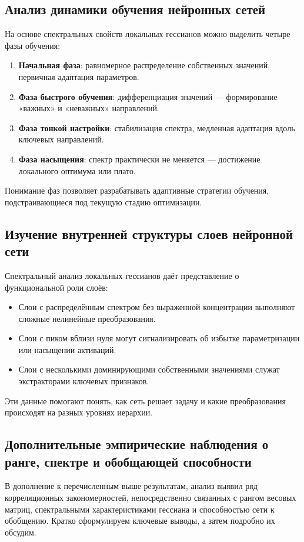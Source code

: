 \documentclass[a4paper,12pt]{article}
\begin{document}
\subsection{Анализ динамики обучения нейронных сетей}
На основе спектральных свойств локальных гессианов можно выделить четыре фазы обучения:
\begin{enumerate}
  \item \textbf{Начальная фаза}: равномерное распределение собственных значений, первичная адаптация параметров.
  \item \textbf{Фаза быстрого обучения}: дифференциация значений — формирование «важных» и «неважных» направлений.
  \item \textbf{Фаза тонкой настройки}: стабилизация спектра, медленная адаптация вдоль ключевых направлений.
  \item \textbf{Фаза насыщения}: спектр практически не меняется — достижение локального оптимума или плато.
\end{enumerate}

Понимание фаз позволяет разрабатывать адаптивные стратегии обучения, подстраивающиеся под текущую стадию оптимизации.

\subsection{Изучение внутренней структуры слоев нейронной сети}
Спектральный анализ локальных гессианов даёт представление о функциональной роли слоёв:
\begin{itemize}
  \item Слои с распределённым спектром без выраженной концентрации выполняют сложные нелинейные преобразования.
  \item Слои с пиком вблизи нуля могут сигнализировать об избытке параметризации или насыщении активаций.
  \item Слои с несколькими доминирующими собственными значениями служат экстракторами ключевых признаков.
\end{itemize}

Эти данные помогают понять, как сеть решает задачу и какие преобразования происходят на разных уровнях иерархии.

\subsection{Дополнительные эмпирические наблюдения о ранге, спектре и обобщающей способности}

В дополнение к перечисленным выше результатам, анализ выявил ряд корреляционных закономерностей,
непосредственно связанных с рангом весовых матриц, спектральными характеристиками гессиана и способностью
сети к обобщению. Кратко сформулируем ключевые выводы, а затем подробно их обсудим.
\end{document}
